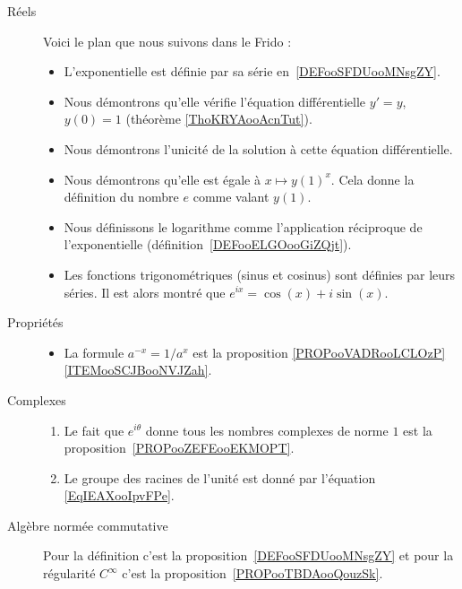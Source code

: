 \begin{description}
    \item[Réels]

Voici le plan que nous suivons dans le Frido :
\begin{itemize}
    \item L'exponentielle est définie par sa série en~\ref{DEFooSFDUooMNsgZY}.
    \item Nous démontrons qu'elle vérifie l'équation différentielle \( y'=y\), \( y(0)=1\) (théorème \ref{ThoKRYAooAcnTut}).
    \item Nous démontrons l'unicité de la solution à cette équation différentielle.
    \item Nous démontrons qu'elle est égale à \( x\mapsto y(1)^x\). Cela donne la définition du nombre \( e\) comme valant \( y(1)\).
    \item Nous définissons le logarithme comme l'application réciproque de l'exponentielle (définition~\ref{DEFooELGOooGiZQjt}).
    \item Les fonctions trigonométriques (sinus et cosinus) sont définies par leurs séries. Il est alors montré que \(  e^{ix}=\cos(x)+i\sin(x)\).
\end{itemize}

    \item[Propriétés]
        \begin{itemize}
            \item 
        La formule \( a^{-x}=1/a^x\) est la proposition \ref{PROPooVADRooLCLOzP}\ref{ITEMooSCJBooNVJZah}.
        \end{itemize}

    \item[Complexes]

        \begin{enumerate}
            \item
                Le fait que \(  e^{i\theta}\) donne tous les nombres complexes de norme \( 1\) est la proposition~\ref{PROPooZEFEooEKMOPT}.
            \item
                Le groupe des racines de l'unité est donné par l'équation \eqref{EqIEAXooIpvFPe}.
        \end{enumerate}

    \item[Algèbre normée commutative]

        Pour la définition c'est la proposition~\ref{DEFooSFDUooMNsgZY} et pour la régularité \(  C^{\infty}\) c'est la proposition~\ref{PROPooTBDAooQouzSk}.


\end{description}
